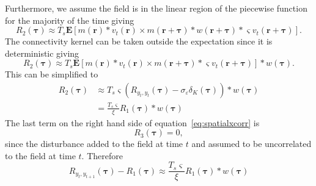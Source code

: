 \documentclass[]{article}
\begin{document}
Furthermore, we assume the field is in the linear region of the piecewise function for the majority of the time giving
\begin{equation}
	R_2(\boldsymbol{\tau}) \approx T_s\mathbf{E}\left[ m\left(\mathbf{r}\right) \ast v_t\left(\mathbf{r}\right) \times m\left(\mathbf{r}+\boldsymbol{\tau}\right) \ast w\left(\mathbf{r}+\boldsymbol{\tau}\right) \ast \varsigma v_t\left(\mathbf{r}+\boldsymbol{\tau}\right) \right].
\end{equation}
The connectivity kernel can be taken outside the expectation since it is deterministic giving
\begin{equation}
	R_2(\boldsymbol{\tau}) \approx T_s\mathbf{E}\left[ m\left(\mathbf{r}\right) \ast v_t\left(\mathbf{r}\right) \times m\left(\mathbf{r}+\boldsymbol{\tau}\right)  \ast \varsigma v_t\left(\mathbf{r}+\boldsymbol{\tau}\right) \right] \ast w\left(\boldsymbol{\tau}\right).
\end{equation}
This can be simplified to
\begin{align}
	R_2(\boldsymbol{\tau}) &\approx T_s \varsigma \left( R_{y_{t},y_{t}}(\boldsymbol{\tau}) - \sigma_{\varepsilon}\delta_K\left(\boldsymbol{\tau}\right) \right) \ast w\left(\boldsymbol{\tau}\right) \\
	&= \frac{T_s \varsigma}{\xi} R_1(\boldsymbol{\tau}) \ast w\left(\boldsymbol{\tau}\right)
\end{align}
The last term on the right hand side of equation~\ref{eq:spatialxcorr} is
\begin{equation}
	R_3(\boldsymbol{\tau}) = 0,
\end{equation}
since the disturbance added to the field at time $t$ and assumed to be uncorrelated to the field at time $t$. Therefore 
\begin{equation}
	R_{y_{t},y_{t+1}}(\boldsymbol{\tau}) - R_1(\boldsymbol{\tau}) \approx \frac{T_s \varsigma}{\xi} R_1(\boldsymbol{\tau}) \ast w\left(\boldsymbol{\tau}\right)
\end{equation}
\end{document}
